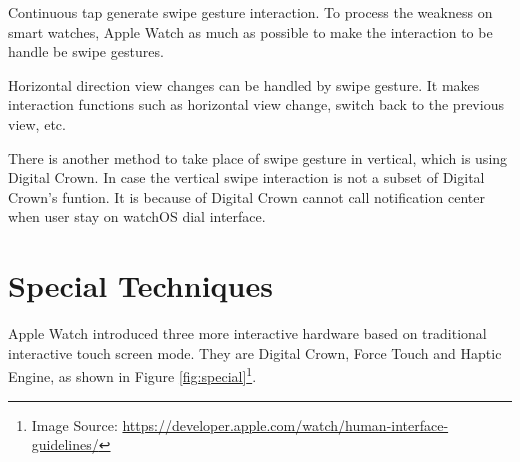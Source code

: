 Continuous tap generate swipe gesture interaction.
To process the weakness on smart watches, Apple Watch as much as possible to make the interaction to be handle be swipe gestures.

Horizontal direction view changes can be handled by swipe gesture.
It makes interaction functions such as horizontal view change, switch back to the previous view, etc.

There is another method to take place of swipe gesture in vertical, which is using Digital Crown.
In case the vertical swipe interaction is not a subset of Digital Crown's funtion. It is because of Digital Crown cannot call notification center when user stay on watchOS dial interface.

\section{Special Techniques}

Apple Watch introduced three more interactive hardware based on traditional interactive touch screen mode. They are Digital Crown, Force Touch and Haptic Engine, as shown in Figure \ref{fig:special}\footnote{Image Source: \url{https://developer.apple.com/watch/human-interface-guidelines/}}.


